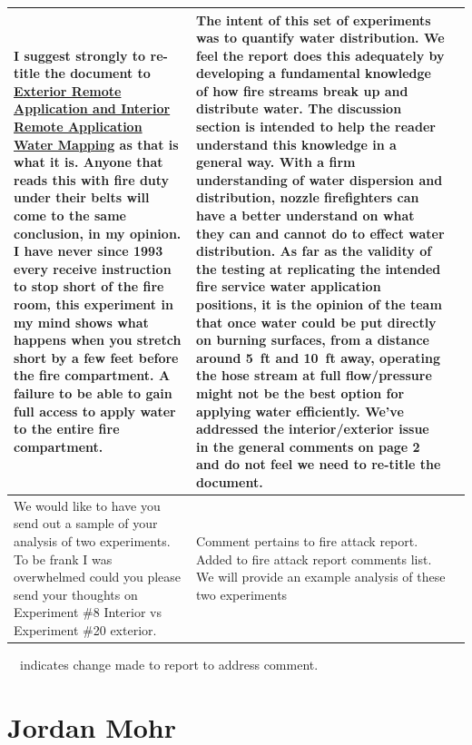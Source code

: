 \documentclass[12pt,oneside]{book}
\begin{document}
\begin{landscape}
\begin{longtable}{|L{4in}|L{3.75in}|c|}
		\hline
		I suggest strongly to re-title the document to \textbf{\ul{Exterior Remote Application and Interior Remote Application Water Mapping}} as that is what it is.  Anyone that reads this with fire duty under their belts will come to the same conclusion, in my opinion.  I have never since 1993 every receive instruction to stop short of the fire room, this experiment in my mind shows what happens when you stretch short by a few feet before the fire compartment.  A failure to be able to gain full access to apply water to the entire fire compartment.    & 
		The intent of this set of experiments was to quantify water distribution. We feel the report does this adequately by developing a fundamental knowledge of how fire streams break up and distribute water. The discussion section is intended to help the reader understand this knowledge in a general way. With a firm understanding of water dispersion and distribution, nozzle firefighters can have a better understand on what they can and cannot do to effect water distribution. As far as the validity of the testing at replicating the intended fire service water application positions, it is the opinion of the team that once water could be put directly on burning surfaces, from a distance around 5~ft and 10~ft away, operating the hose stream at full flow/pressure might not be the best option for applying water efficiently. We've addressed the interior/exterior issue in the general comments on page 2 and do not feel we need to re-title the document. & \checkmark \\

		\hline
		We would like to have you send out a sample of your analysis of two experiments.  To be frank I was overwhelmed could you please send your thoughts on Experiment \#8 Interior vs  Experiment \#20 exterior.  & 
		Comment pertains to fire attack report. Added to fire attack report comments list. We will provide an example analysis of these two experiments & \\

		\hline

\end{longtable}
\checkmark~~indicates change made to report to address comment.

\newpage

\section{Jordan Mohr}
\begin{longtable}{|L{4in}|L{3.75in}|c|}


\end{longtable}
\end{landscape}
\end{document}
